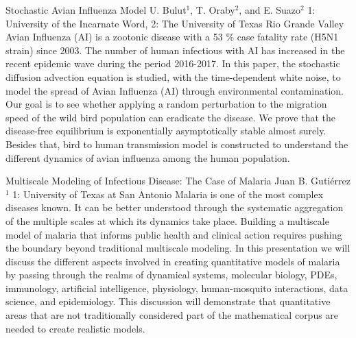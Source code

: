 \begin{addmargin}[2em]{0em}
\vspace{2ex}
\abs
{Stochastic Avian Influenza Model}
{U. Bulut$^{1}$, T. Oraby$^{2}$, and E. Suazo$^{2}$}
{1: University of the Incarnate Word, 2: The University of Texas Rio Grande Valley}
{Avian Influenza (AI) is a zootonic disease with a 53 \% case fatality rate (H5N1 strain) since 2003. The number of human infectious with AI has increased in the recent epidemic wave during the period 2016-2017.  In this paper, the stochastic diffusion advection equation is studied, with the time-dependent white noise, to model the spread of Avian Influenza (AI) through environmental contamination. Our goal is to see whether applying a random perturbation to the migration speed of the wild bird population can eradicate the disease. We prove that the disease-free equilibrium is exponentially asymptotically stable almost surely. Besides that, bird to human transmission model is constructed to understand the different dynamics  of avian influenza among the human population.}


\vspace{1.5ex}
\abs
{Multiscale Modeling of Infectious Disease: The Case of Malaria}
{Juan B. Guti\'errez$^{1}$}
{1: University of Texas at San Antonio}
{Malaria is one of the most complex diseases known. It can be better understood through the systematic aggregation of the multiple scales at which its dynamics take place. Building a multiscale model of malaria that informs public health and clinical action requires pushing the boundary beyond traditional multiscale modeling. In this presentation we will discuss the different aspects involved in creating quantitative models of malaria by passing through the realms of dynamical systems, molecular biology, PDEs, immunology, artificial intelligence, physiology, human-mosquito interactions, data science, and epidemiology. This discussion will demonstrate that quantitative areas that are not traditionally considered part of the mathematical corpus are needed to create realistic models.}



\end{addmargin}
